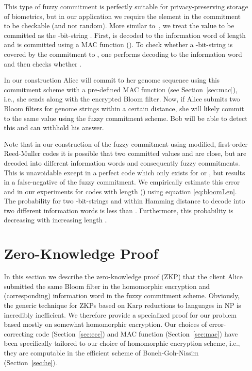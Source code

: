 \documentclass{llncs}
\begin{document}
This type of fuzzy commitment is perfectly suitable for privacy-preserving storage of biometrics, but in our application we require the element in the commitment to be checkable (and not random).
More similar to~\cite{DavFra98}, we treat the value to be committed as the -bit-string .
First,  is decoded to the information word  of length  and  is committed using a MAC function ().
To check whether a -bit-string  is covered by the commitment to , one performs decoding to the information word  and then checks whether .



In our construction Alice will commit to her genome sequence using this commitment scheme with a pre-defined MAC function (see Section~\ref{sec:mac}), i.e., she sends  along with the encrypted Bloom filter.
Now, if Alice submits two Bloom filters for genome strings within a certain distance, she will likely commit to the same value  using the fuzzy commitment scheme.
Bob will be able to detect this and can withhold his answer.

Note that in our construction of the fuzzy commitment using modified, first-order Reed-Muller codes it is possible that two committed values  and  are close, but are decoded into different information words and consequently fuzzy commitments.
This is unavoidable except in a perfect code which only exists for  or , but results in a false-negative of the fuzzy commitment.
We empirically estimate this error and in our experiments for codes with length  () using equation \eqref{eq:bloomLen}.
The probability for two -bit-strings  and  within Hamming distance  to decode into two different information words is less than .
Furthermore, this probability is decreasing with increasing length .



\section{Zero-Knowledge Proof}
\label{sec:zkp}

In this section we describe the zero-knowledge proof (ZKP) that the client Alice submitted the same Bloom filter in the homomorphic encryption and (corresponding) information word in the fuzzy commitment scheme.
Obviously, the generic technique for ZKPs based on Karp reductions to languages in NP is incredibly inefficient.
We therefore provide a specialized proof for our problem based mostly on somewhat homomorphic encryption.
Our choices of error-correcting code (Section~\ref{sec:ecc}) and MAC function (Section~\ref{sec:mac}) have been specifically tailored to our choice of homomorphic encryption scheme, i.e., they are computable in the efficient scheme of Boneh-Goh-Nissim (Section~\ref{sec:he}).
\end{document}
